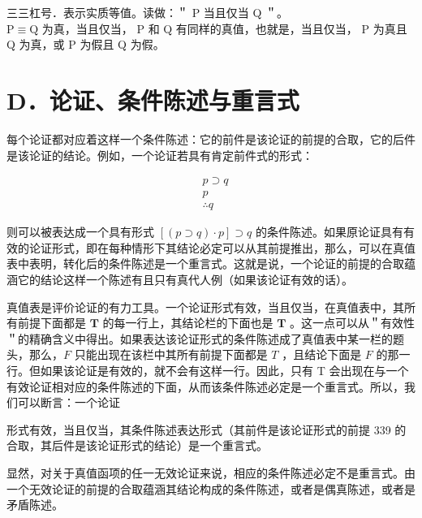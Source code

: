 三三杠号．表示实质等值。读做：＂ P 当且仅当 Q ＂。\\
$\mathrm{P} \equiv \mathrm{Q}$ 为真，当且仅当， P 和 Q 有同样的真值，也就是，当且仅当， P 为真且 Q 为真，或 P 为假且 Q 为假。

\section*{D．论证、条件陈述与重言式}
每个论证都对应着这样一个条件陈述：它的前件是该论证的前提的合取，它的后件是该论证的结论。例如，一个论证若具有肯定前件式的形式：

$$
\begin{aligned}
& p \supset q \\
& p \\
& \therefore q
\end{aligned}
$$

则可以被表达成一个具有形式 $[(p \supset q) \cdot p] \supset q$ 的条件陈述。如果原论证具有有效的论证形式，即在每种情形下其结论必定可以从其前提推出，那么，可以在真值表中表明，转化后的条件陈述是一个重言式。这就是说，一个论证的前提的合取蕴涵它的结论这样一个陈述有且只有真代人例（如果该论证有效的话）。

真值表是评价论证的有力工具。一个论证形式有效，当且仅当，在真值表中，其所有前提下面都是 $\mathbf{T}$ 的每一行上，其结论栏的下面也是 $\mathbf{T}$ 。这一点可以从＂有效性＂的精确含义中得出。如果表达该论证形式的条件陈述成了真值表中某一栏的题头，那么，$F$ 只能出现在该栏中其所有前提下面都是 $T$ ，且结论下面是 $F$ 的那一行。但如果该论证是有效的，就不会有这样一行。因此，只有 T 会出现在与一个有效论证相对应的条件陈述的下面，从而该条件陈述必定是一个重言式。所以，我们可以断言：一个论证

形式有效，当且仅当，其条件陈述表达形式（其前件是该论证形式的前提 339 的合取，其后件是该论证形式的结论）是一个重言式。

显然，对关于真值函项的任一无效论证来说，相应的条件陈述必定不是重言式。由一个无效论证的前提的合取蕴涵其结论构成的条件陈述，或者是偶真陈述，或者是矛盾陈述。 